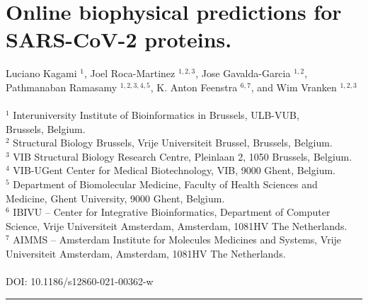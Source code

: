 \chapter{Online biophysical predictions for SARS-CoV-2 proteins.}\label{chapter:corona}

Luciano Kagami $^{1}$, Joel Roca-Martinez $^{1,2,3}$, Jose Gavalda-Garcia $^{1,2}$, Pathmanaban Ramasamy $^{1,2,3,4,5}$, K. Anton Feenstra $^{6,7}$, and Wim Vranken $^{1,2,3}$
\\
\\
$^{1}$ Interuniversity Institute of Bioinformatics in Brussels, ULB-VUB, \\Brussels, Belgium.
\\
$^{2}$ Structural Biology Brussels, Vrije Universiteit Brussel, Brussels, Belgium.
\\
$^{3}$ VIB Structural Biology Research Centre, Pleinlaan 2, 1050 Brussels, Belgium.
\\
$^{4}$ VIB-UGent Center for Medical Biotechnology, VIB, 9000 Ghent, Belgium.
\\
$^{5}$ Department of Biomolecular Medicine, Faculty of Health Sciences and Medicine, Ghent University, 9000 Ghent, Belgium.
\\
$^{6}$ IBIVU – Center for Integrative Bioinformatics, Department of Computer Science, Vrije Universiteit Amsterdam, Amsterdam, 1081HV The Netherlands.
\\
$^{7}$ AIMMS – Amsterdam Institute for Molecules Medicines and Systems, Vrije Universiteit Amsterdam, Amsterdam, 1081HV The Netherlands.
\\
\\
DOI: 10.1186/s12860-021-00362-w
\vspace{1em}
\hrule
\vspace{1em}

